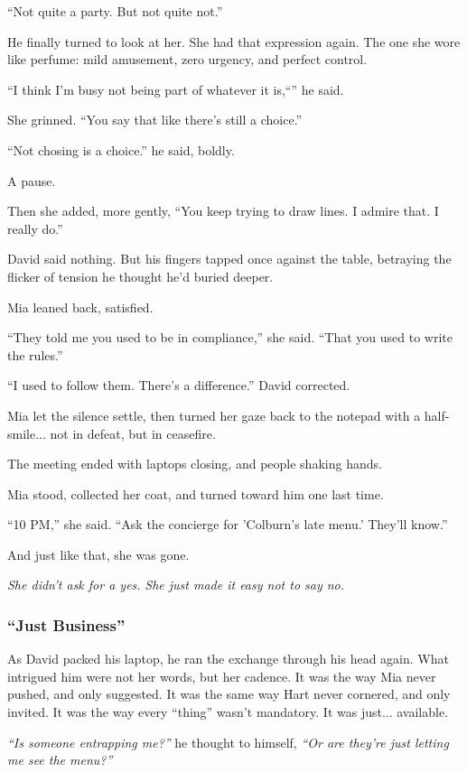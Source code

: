 ``Not quite a party. But not quite not.''

He finally turned to look at her. She had that expression again. The one she wore like perfume: mild amusement, 
zero urgency, and perfect control.

``I think I’m busy not being part of whatever it is,``'' he said.

She grinned. ``You say that like there’s still a choice.''

``Not chosing is a choice.'' he said, boldly.

A pause.

Then she added, more gently, ``You keep trying to draw lines. I admire that. I really do.''

David said nothing. But his fingers tapped once against the table, betraying the flicker of tension he thought 
he’d buried deeper.

Mia leaned back, satisfied.

``They told me you used to be in compliance,'' she said. ``That you used to write the rules.''

``I used to follow them. There's a difference.'' David corrected.

Mia let the silence settle, then turned her gaze back to the notepad with a half-smile... not in defeat, but in ceasefire.

The meeting ended with laptops closing, and people shaking hands.

Mia stood, collected her coat, and turned toward him one last time.

``10 PM,'' she said. ``Ask the concierge for 'Colburn’s late menu.' They'll know.''

And just like that, she was gone.

\textit{She didn’t ask for a yes.}
\textit{She just made it easy not to say no.}

\subsubsection{``Just Business''}

As David packed his laptop, he ran the exchange through his head again. What intrigued him were not her words, 
but her cadence. It was the way Mia never pushed, and only suggested. It was the same way Hart never cornered, and only 
invited. It was the way every ``thing'' wasn’t mandatory. It was just... available.

\textit{``Is someone entrapping me?''} he thought to himself, \textit{``Or are they’re just letting me see the menu?''}

